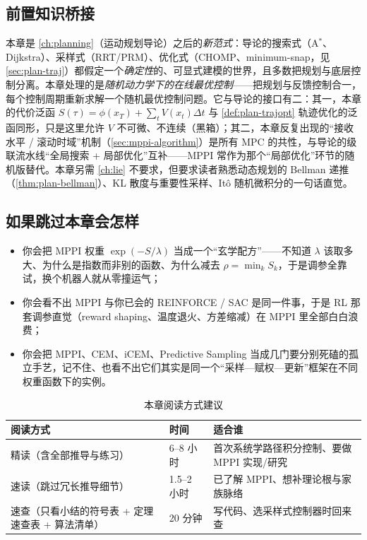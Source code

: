 \subsection*{前置知识桥接}
本章是 \cref{ch:planning}（运动规划导论）之后的\emph{新范式}：导论的搜索式（A$^*$、Dijkstra）、采样式（RRT/PRM）、优化式（CHOMP、minimum-snap，见 \cref{sec:plan-traj}）都假定一个\emph{确定性}的、可显式建模的世界，且多数把规划与底层控制分离。本章处理的是\emph{随机动力学下的在线最优控制}——把规划与反馈控制合一，每个控制周期重新求解一个随机最优控制问题。它与导论的接口有二：其一，本章的代价泛函 $S(\tau)=\phi(x_T)+\sum_t V(x_t)\Delta t$ 与 \cref{def:plan-trajopt} 轨迹优化的泛函同形，只是这里允许 $V$ 不可微、不连续（黑箱）；其二，本章反复出现的“接收水平 / 滚动时域”机制（\cref{sec:mppi-algorithm}）是所有 MPC 的共性，与导论的级联流水线“全局搜索 + 局部优化”互补——MPPI 常作为那个“局部优化”环节的随机版替代。本章另需 \cref{ch:lie} 不要求，但要求读者熟悉动态规划的 Bellman 递推（\cref{thm:plan-bellman}）、KL 散度与重要性采样、Itô 随机微积分的一句话直觉。

\subsection*{如果跳过本章会怎样}
\begin{itemize}
  \item 你会把 MPPI 权重 $\exp(-S/\lambda)$ 当成一个“玄学配方”——不知道 $\lambda$ 该取多大、为什么是指数而非别的函数、为什么减去 $\rho=\min_k S_k$，于是调参全靠试，换个机器人就从零撞运气；
  \item 你会看不出 MPPI 与你已会的 REINFORCE / SAC 是同一件事，于是 RL 那套调参直觉（reward shaping、温度退火、方差缩减）在 MPPI 里全部白白浪费；
  \item 你会把 MPPI、CEM、iCEM、Predictive Sampling 当成几门要分别死磕的孤立手艺，记不住、也看不出它们其实是同一个“采样—赋权—更新”框架在不同权重函数下的实例。
\end{itemize}

\begin{table}[H]\centering\small
\caption{本章阅读方式建议}
\label{tab:mppi-reading}
\begin{tabular}{lll}
\toprule
阅读方式 & 时间 & 适合谁 \\
\midrule
精读（含全部推导与练习） & 6--8 小时 & 首次系统学路径积分控制、要做 MPPI 实现/研究 \\
速读（跳过冗长推导细节） & 1.5--2 小时 & 已了解 MPPI、想补理论根与家族脉络 \\
速查（只看小结的符号表 + 定理速查表 + 算法清单） & 20 分钟 & 写代码、选采样式控制器时回来查 \\
\bottomrule
\end{tabular}
\end{table}

